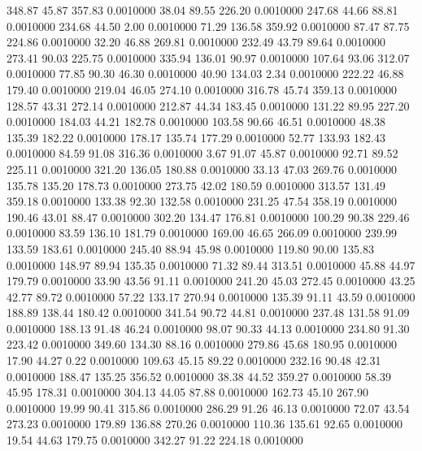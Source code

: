  348.87   45.87  357.83   0.0010000
  38.04   89.55  226.20   0.0010000
 247.68   44.66   88.81   0.0010000
 234.68   44.50    2.00   0.0010000
  71.29  136.58  359.92   0.0010000
  87.47   87.75  224.86   0.0010000
  32.20   46.88  269.81   0.0010000
 232.49   43.79   89.64   0.0010000
 273.41   90.03  225.75   0.0010000
 335.94  136.01   90.97   0.0010000
 107.64   93.06  312.07   0.0010000
  77.85   90.30   46.30   0.0010000
  40.90  134.03    2.34   0.0010000
 222.22   46.88  179.40   0.0010000
 219.04   46.05  274.10   0.0010000
 316.78   45.74  359.13   0.0010000
 128.57   43.31  272.14   0.0010000
 212.87   44.34  183.45   0.0010000
 131.22   89.95  227.20   0.0010000
 184.03   44.21  182.78   0.0010000
 103.58   90.66   46.51   0.0010000
  48.38  135.39  182.22   0.0010000
 178.17  135.74  177.29   0.0010000
  52.77  133.93  182.43   0.0010000
  84.59   91.08  316.36   0.0010000
   3.67   91.07   45.87   0.0010000
  92.71   89.52  225.11   0.0010000
 321.20  136.05  180.88   0.0010000
  33.13   47.03  269.76   0.0010000
 135.78  135.20  178.73   0.0010000
 273.75   42.02  180.59   0.0010000
 313.57  131.49  359.18   0.0010000
 133.38   92.30  132.58   0.0010000
 231.25   47.54  358.19   0.0010000
 190.46   43.01   88.47   0.0010000
 302.20  134.47  176.81   0.0010000
 100.29   90.38  229.46   0.0010000
  83.59  136.10  181.79   0.0010000
 169.00   46.65  266.09   0.0010000
 239.99  133.59  183.61   0.0010000
 245.40   88.94   45.98   0.0010000
 119.80   90.00  135.83   0.0010000
 148.97   89.94  135.35   0.0010000
  71.32   89.44  313.51   0.0010000
  45.88   44.97  179.79   0.0010000
  33.90   43.56   91.11   0.0010000
 241.20   45.03  272.45   0.0010000
  43.25   42.77   89.72   0.0010000
  57.22  133.17  270.94   0.0010000
 135.39   91.11   43.59   0.0010000
 188.89  138.44  180.42   0.0010000
 341.54   90.72   44.81   0.0010000
 237.48  131.58   91.09   0.0010000
 188.13   91.48   46.24   0.0010000
  98.07   90.33   44.13   0.0010000
 234.80   91.30  223.42   0.0010000
 349.60  134.30   88.16   0.0010000
 279.86   45.68  180.95   0.0010000
  17.90   44.27    0.22   0.0010000
 109.63   45.15   89.22   0.0010000
 232.16   90.48   42.31   0.0010000
 188.47  135.25  356.52   0.0010000
  38.38   44.52  359.27   0.0010000
  58.39   45.95  178.31   0.0010000
 304.13   44.05   87.88   0.0010000
 162.73   45.10  267.90   0.0010000
  19.99   90.41  315.86   0.0010000
 286.29   91.26   46.13   0.0010000
  72.07   43.54  273.23   0.0010000
 179.89  136.88  270.26   0.0010000
 110.36  135.61   92.65   0.0010000
  19.54   44.63  179.75   0.0010000
 342.27   91.22  224.18   0.0010000
